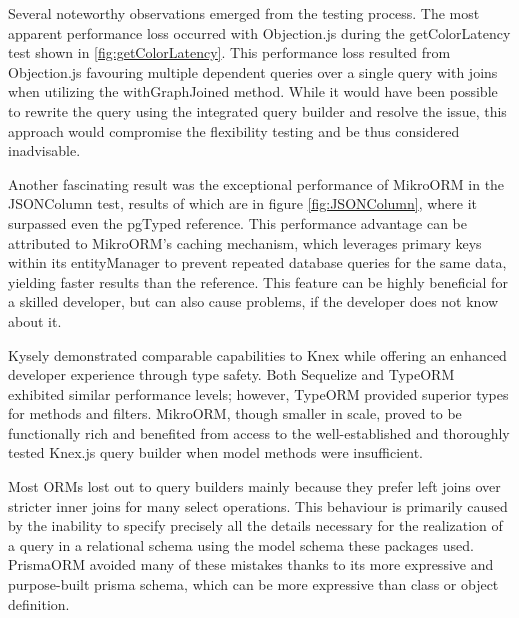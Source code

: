 Several noteworthy observations emerged from the testing process. The most
apparent performance loss occurred with Objection.js during the getColorLatency
test shown in \ref{fig:getColorLatency}. This performance loss resulted from
Objection.js favouring multiple dependent queries over a single query with joins
when utilizing the withGraphJoined method. While it would have been possible to
rewrite the query using the integrated query builder and resolve the issue, this
approach would compromise the flexibility testing and be thus considered
inadvisable.

Another fascinating result was the exceptional performance of MikroORM in the
JSONColumn test, results of which are in figure \ref{fig:JSONColumn}, where it
surpassed even the pgTyped reference. This performance advantage can be
attributed to MikroORM's caching mechanism, which leverages primary keys within
its entityManager to prevent repeated database queries for the same data,
yielding faster results than the reference. This feature can be highly
beneficial for a skilled developer, but can also cause problems, if the
developer does not know about it.

Kysely demonstrated comparable capabilities to Knex while offering an enhanced
developer experience through type safety. Both Sequelize and TypeORM exhibited
similar performance levels; however, TypeORM provided superior types for methods
and filters. MikroORM, though smaller in scale, proved to be functionally rich
and benefited from access to the well-established and thoroughly tested Knex.js
query builder when model methods were insufficient.

Most ORMs lost out to query builders mainly because they prefer left joins over
stricter inner joins for many select operations. This behaviour is primarily
caused by the inability to specify precisely all the details necessary for the
realization of a query in a relational schema using the model schema these
packages used. PrismaORM avoided many of these mistakes thanks to its more
expressive and purpose-built prisma schema, which can be more expressive than
class or object definition.



